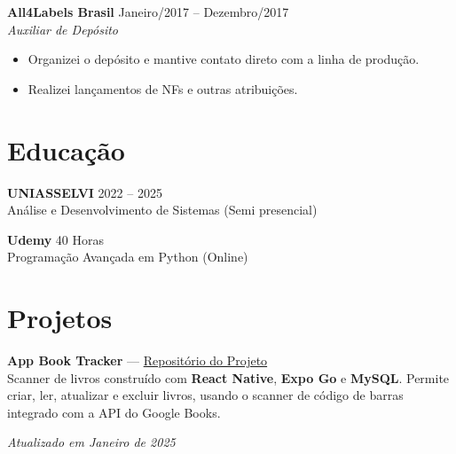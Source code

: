 \documentclass[a4paper,10pt]{article}
\begin{document}
\textbf{All4Labels Brasil} \hfill Janeiro/2017 – Dezembro/2017 \\
\textit{Auxiliar de Depósito} 
\begin{itemize}[leftmargin=*]
    \item Organizei o depósito e mantive contato direto com a linha de produção.
    \item Realizei lançamentos de NFs e outras atribuições.
\end{itemize}

\section*{Educação}
\textbf{UNIASSELVI} \hfill 2022 – 2025 \\
Análise e Desenvolvimento de Sistemas (Semi presencial)

\textbf{Udemy} \hfill 40 Horas \\
Programação Avançada em Python (Online)

\section*{Projetos}
\textbf{App Book Tracker} — \href{https://github.com/romariojs94/Book-Tracker-App}{Repositório do Projeto} \\
Scanner de livros construído com \textbf{React Native}, \textbf{Expo Go} e \textbf{MySQL}. Permite criar, ler, atualizar e excluir livros, usando o scanner de código de barras integrado com a API do Google Books.

\vspace{1cm}
\begin{center}
    \textit{Atualizado em Janeiro de 2025}
\end{center}
\end{document}
